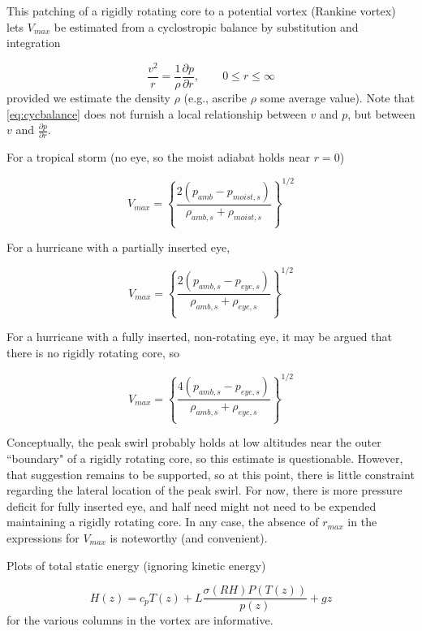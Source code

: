 \documentclass[preprint, prX]{revtex4}
\newcommand{\cbfrac}[2]{\left\{\frac{#1}{#2}\right\}}
\newcommand{\pd}[2]{\frac{\partial#1}{\partial#2}}
\begin{document}
This patching of a rigidly rotating core to a potential vortex (Rankine vortex) lets $V_{max}$ be estimated from a cyclostropic balance by substitution and integration

\begin{equation}
	\frac{v^2}{r} = \frac{1}{\rho} \pd{p}{r}, \qquad 0 \le r \le \infty
	\label{eq:cycbalance}
\end{equation}
provided we estimate the density $\rho$ (e.g., ascribe $\rho$ some average value). Note that \eqref{eq:cycbalance} does not furnish a local relationship between $v$ and $p$, but between $v$ and $\pd{p}{r}$.

For a tropical storm (no eye, so the moist adiabat holds near $r=0$)

\begin{equation}
	V_{max} = \cbfrac{ 2 ( p_{amb} - p_{moist,s})}{ \rho_{amb,s} + \rho_{moist,s} }^{1/2}
\end{equation}

For a hurricane with a partially inserted eye,

\begin{equation}
	V_{max} = \cbfrac{ 2 ( p_{amb,s} - p_{eye,s})}{ \rho_{amb,s} + \rho_{eye,s} }^{1/2}
\end{equation}

For a hurricane with a fully inserted, non-rotating eye, it may be argued that there is no rigidly rotating core, so

\begin{equation}
	V_{max} = \cbfrac{ 4 ( p_{amb,s} - p_{eye,s})}{ \rho_{amb,s} + \rho_{eye,s} }^{1/2}
\end{equation}

Conceptually, the peak swirl probably holds at low altitudes near the outer ``boundary" of a rigidly rotating core, so this estimate is questionable. However, that suggestion remains to be supported, so at this point, there is little constraint regarding the lateral location of the peak swirl. For now, there is more pressure deficit for fully inserted eye, and half need might not need to be expended maintaining a rigidly rotating core. In any case, the absence of $r_{max}$ in the expressions for $V_{max}$ is noteworthy (and convenient).

Plots of total static energy (ignoring kinetic energy)

\begin{equation}
	H(z) = c_p T(z) + L \frac{\sigma(RH) P(T(z))}{p(z)} + g z
\end{equation}
for the various columns in the vortex are informative.
\end{document}
